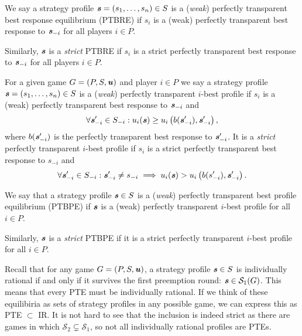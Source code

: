 \begin{definition}
	We say a strategy profile $\boldsymbol{\mathit{s}} = (s_1, \dots, s_n) \in S$ is a (\textit{weak}) perfectly transparent best response equilibrium (PTBRE) if $s_i$ is a (weak) perfectly transparent best response to $\boldsymbol{\mathit{s}}_{-i}$ for all players $i \in P$.
	
	Similarly, $\boldsymbol{\mathit{s}}$ is a \textit{strict} PTBRE if $s_i$ is a strict perfectly transparent best response to $\boldsymbol{\mathit{s}}_{-i}$ for all players $i \in P$.
\end{definition}

\begin{definition}
	For a given game $G = (P, S, \boldsymbol{\mathit{u}})$ and player $i \in P$ we say a strategy profile $\boldsymbol{\mathit{s}} = (s_1, \dots, s_n) \in S$ is a (\textit{weak}) perfectly transparent $i$-best profile if
	$s_i$ is a (weak) perfectly transparent best response to $\boldsymbol{\mathit{s}}_{-i}$ and
	\[
		\forall \boldsymbol{\mathit{s}}'_{-i} \in S_{-i}: u_i(\boldsymbol{\mathit{s}}) \ge u_i\left(b(\boldsymbol{\mathit{s}}'_{-i}), \boldsymbol{\mathit{s}}'_{-i}\right),
	\]
	where $b(\boldsymbol{\mathit{s}}'_{-i})$ is the perfectly transparent best response to $\boldsymbol{\mathit{s}}'_{-i}$.
	It is a \textit{strict} perfectly transparent $i$-best profile if $s_i$ is a strict perfectly transparent best response to $s_{-i}$ and
	\[
		\forall \boldsymbol{\mathit{s}}_{-i}' \in S_{-i}: \boldsymbol{\mathit{s}}_{-i}' \ne s_{-i} \implies u_i(\boldsymbol{\mathit{s}}) > u_i\left(b(s_{-i}'), \boldsymbol{\mathit{s}}_{-i}'\right).
	\]
\end{definition}

\begin{definition}
	We say that a strategy profile $\boldsymbol{\mathit{s}} \in S$ is a (\textit{weak}) perfectly transparent best profile equilibrium (PTBPE) if $\boldsymbol{\mathit{s}}$ is a (weak) perfectly transparent $i$-best profile for all $i \in P$.

	Similarly, $\boldsymbol{\mathit{s}}$ is a \textit{strict} PTBPE if it is a strict perfectly transparent $i$-best profile for all $i \in P$.
\end{definition}

Recall that for any game $G = (P, S, \boldsymbol{\mathit{u}})$, a strategy profile $\boldsymbol{\mathit{s}} \in S$ is individually rational if and only if it survives the first preemption round: $\boldsymbol{\mathit{s}} \in \mathcal{S}_1(G)$.
This means that every PTE must be individually rational.
If we think of these equilibiria as sets of strategy profiles in any possible game, we can express this as PTE $\subset$ IR.
It is not hard to see that the inclusion is indeed strict as there are games in which $\mathcal{S}_2 \subsetneq \mathcal{S}_1$, so not all individually rational profiles are PTEs.

